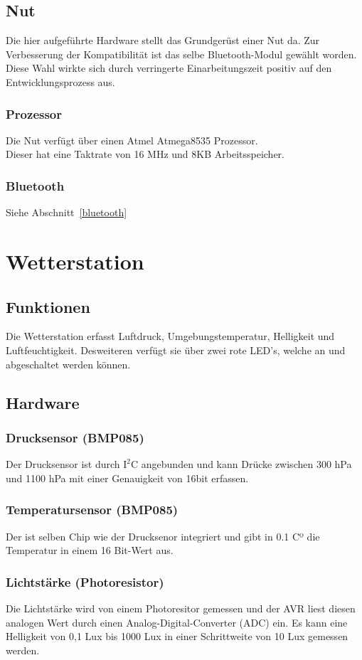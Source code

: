 \documentclass[12pt,a4paper]{article}
\begin{document}
\subsection{Nut}

Die hier aufgeführte Hardware stellt das Grundgerüst einer Nut da.
Zur Verbesserung der Kompatibilität ist das selbe Bluetooth-Modul gewählt worden. Diese Wahl wirkte sich durch verringerte Einarbeitungszeit positiv auf den Entwicklungsprozess aus.

\subsubsection{Prozessor}
Die Nut verfügt über einen Atmel Atmega8535 Prozessor.\\
Dieser hat eine Taktrate von 16 MHz und 8KB Arbeitsspeicher.\\


\subsubsection{Bluetooth}
Siehe Abschnitt~\ref{bluetooth}


\section{Wetterstation}
	\subsection{Funktionen}
	Die Wetterstation erfasst Luftdruck, Umgebungstemperatur, Helligkeit und Luftfeuchtigkeit. Desweiteren verfügt sie über zwei rote LED's, welche an und abgeschaltet werden können.
	\subsection{Hardware}
		\subsubsection{Drucksensor (BMP085)}
		Der Drucksensor ist durch $\text{I}^2$C angebunden und kann Drücke zwischen 300 hPa und 1100 hPa mit einer Genauigkeit von 16bit erfassen.
		\subsubsection{Temperatursensor (BMP085)}
		Der ist selben Chip wie der Drucksenor integriert und gibt in 0.1 Cº die Temperatur in einem 16 Bit-Wert aus.
		\subsubsection{Lichtstärke (Photoresistor)}
		Die Lichtstärke wird von einem Photoresitor gemessen und der AVR liest diesen analogen Wert durch einen Analog-Digital-Converter (ADC) ein. Es kann eine Helligkeit von 0,1 Lux bis 1000 Lux in einer Schrittweite von 10 Lux gemessen werden.
\end{document}
